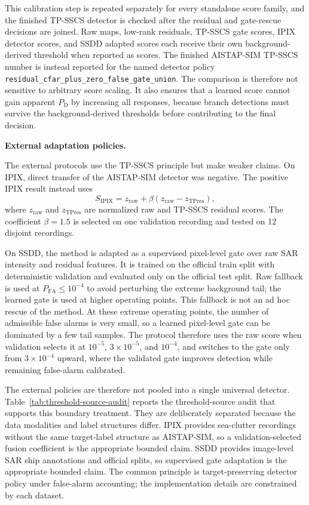 \documentclass[journal]{IEEEtran}
\begin{document}
This calibration step is repeated separately for every standalone score family, and the finished TP-SSCS detector is checked after the residual and gate-rescue decisions are joined. Raw maps, low-rank residuals, TP-SSCS gate scores, IPIX detector scores, and SSDD adapted scores each receive their own background-derived threshold when reported as scores. The finished AISTAP-SIM TP-SSCS number is instead reported for the named detector policy \texttt{residual\_cfar\_plus\_zero\_false\_gate\_union}. The comparison is therefore not sensitive to arbitrary score scaling. It also ensures that a learned score cannot gain apparent $P_{\mathrm{D}}$ by increasing all responses, because branch detections must survive the background-derived thresholds before contributing to the final decision.

\noindent\textbf{External adaptation policies.}

The external protocols use the TP-SSCS principle but make weaker claims. On IPIX, direct transfer of the AISTAP-SIM detector was negative. The positive IPIX result instead uses
\begin{equation}
    S_{\mathrm{IPIX}} = z_{\mathrm{raw}} + \beta
    (z_{\mathrm{raw}} - z_{\mathrm{TPres}}),
\end{equation}
where $z_{\mathrm{raw}}$ and $z_{\mathrm{TPres}}$ are normalized raw and TP-SSCS residual scores. The coefficient $\beta=1.5$ is selected on one validation recording and tested on 12 disjoint recordings.

On SSDD, the method is adapted as a supervised pixel-level gate over raw SAR intensity and residual features. It is trained on the official train split with deterministic validation and evaluated only on the official test split. Raw fallback is used at $P_{\mathrm{FA}} \leq 10^{-4}$ to avoid perturbing the extreme background tail; the learned gate is used at higher operating points. This fallback is not an ad hoc rescue of the method. At these extreme operating points, the number of admissible false alarms is very small, so a learned pixel-level gate can be dominated by a few tail samples. The protocol therefore uses the raw score when validation selects it at $10^{-5}$, $3\times10^{-5}$, and $10^{-4}$, and switches to the gate only from $3\times10^{-4}$ upward, where the validated gate improves detection while remaining false-alarm calibrated.

The external policies are therefore not pooled into a single universal detector. Table~\ref{tab:threshold-source-audit} reports the threshold-source audit that supports this boundary treatment. They are deliberately separated because the data modalities and label structures differ. IPIX provides sea-clutter recordings without the same target-label structure as AISTAP-SIM, so a validation-selected fusion coefficient is the appropriate bounded claim. SSDD provides image-level SAR ship annotations and official splits, so supervised gate adaptation is the appropriate bounded claim. The common principle is target-preserving detector policy under false-alarm accounting; the implementation details are constrained by each dataset.
\end{document}
